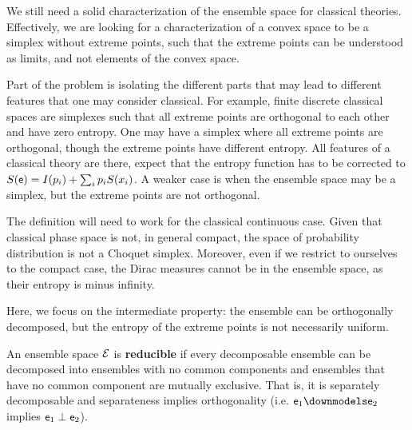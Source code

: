 {We still need a solid characterization of the ensemble space for classical theories. Effectively, we are looking for a characterization of a convex space to be a simplex without extreme points, such that the extreme points can be understood as limits, and not elements of the convex space.}

Part of the problem is isolating the different parts that may lead to different features that one may consider classical. For example, finite discrete classical spaces are simplexes such that all extreme points are orthogonal to each other and have zero entropy. One may have a simplex where all extreme points are orthogonal, though the extreme points have different entropy. All features of a classical theory are there, expect that the entropy function has to be corrected to $S(\mathsf{e}) = I(p_i) + \sum_i p_i S(x_i)$. A weaker case is when the ensemble space may be a simplex, but the extreme points are not orthogonal.

The definition will need to work for the classical continuous case. Given that classical phase space is not, in general compact, the space of probability distribution is not a Choquet simplex. Moreover, even if we restrict to ourselves to the compact case, the Dirac measures cannot be in the ensemble space, as their entropy is minus infinity. 

Here, we focus on the intermediate property: the ensemble can be orthogonally decomposed, but the entropy of the extreme points is not necessarily uniform. 

\begin{defn}
	An ensemble space $\mathcal{E}$ is \textbf{reducible} if every decomposable ensemble can be decomposed into ensembles with no common components and ensembles that have no common component are mutually exclusive. That is, it is separately decomposable and separateness implies orthogonality (i.e. $\ens_1 \separate \ens_2$ implies $\mathsf{e}_1 \perp \mathsf{e}_2$).
\end{defn}

